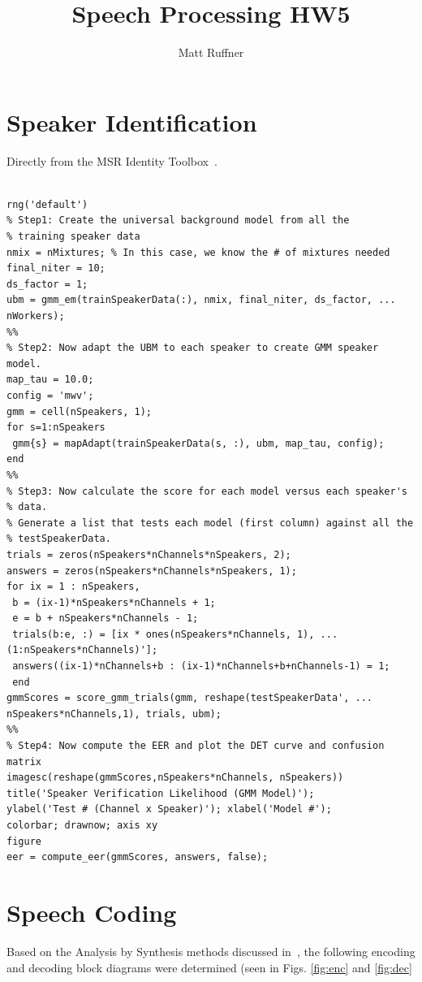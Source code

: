 \documentclass[letterpaper]{article}
\title{Speech Processing HW5}
\author{Matt Ruffner}
\begin{document}
\maketitle

\section{Speaker Identification}
Directly from the MSR Identity Toolbox~\cite{msr}.


\begin{lstlisting}[caption = {GMM-UBM Training Code from THe MSR Toolbox.}]

rng('default')
% Step1: Create the universal background model from all the
% training speaker data
nmix = nMixtures; % In this case, we know the # of mixtures needed
final_niter = 10;
ds_factor = 1;
ubm = gmm_em(trainSpeakerData(:), nmix, final_niter, ds_factor, ...
nWorkers);
%%
% Step2: Now adapt the UBM to each speaker to create GMM speaker model.
map_tau = 10.0;
config = 'mwv';
gmm = cell(nSpeakers, 1);
for s=1:nSpeakers
 gmm{s} = mapAdapt(trainSpeakerData(s, :), ubm, map_tau, config);
end
%%
% Step3: Now calculate the score for each model versus each speaker's
% data.
% Generate a list that tests each model (first column) against all the
% testSpeakerData.
trials = zeros(nSpeakers*nChannels*nSpeakers, 2);
answers = zeros(nSpeakers*nChannels*nSpeakers, 1);
for ix = 1 : nSpeakers,
 b = (ix-1)*nSpeakers*nChannels + 1;
 e = b + nSpeakers*nChannels - 1;
 trials(b:e, :) = [ix * ones(nSpeakers*nChannels, 1), ...
(1:nSpeakers*nChannels)'];
 answers((ix-1)*nChannels+b : (ix-1)*nChannels+b+nChannels-1) = 1;
 end
gmmScores = score_gmm_trials(gmm, reshape(testSpeakerData', ...
nSpeakers*nChannels,1), trials, ubm);
%%
% Step4: Now compute the EER and plot the DET curve and confusion matrix
imagesc(reshape(gmmScores,nSpeakers*nChannels, nSpeakers))
title('Speaker Verification Likelihood (GMM Model)');
ylabel('Test # (Channel x Speaker)'); xlabel('Model #');
colorbar; drawnow; axis xy
figure
eer = compute_eer(gmmScores, answers, false);

\end{lstlisting}

\section{Speech Coding}

Based on the Analysis by Synthesis methods discussed in~\cite{info7020032}, the following encoding and decoding block diagrams were determined (seen in Figs. \ref{fig:enc} and \ref{fig:dec}
\end{document}
